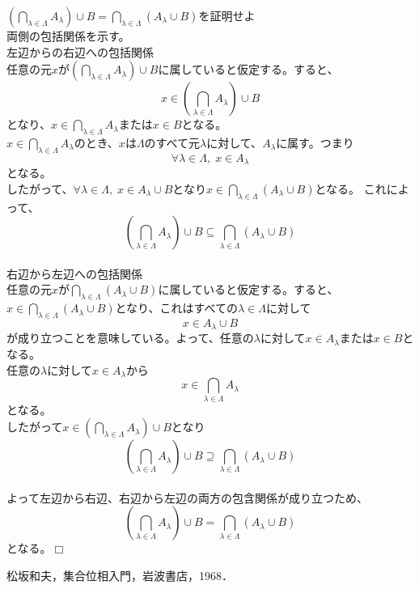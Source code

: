 \documentclass[a4j]{jsarticle}
\def \QED{\hfill $\Box$}%
\begin{document}
$\left( \bigcap_{\lambda \in \Lambda}A_\lambda \right) \cup B = \bigcap_{\lambda \in \Lambda}(A_\lambda \cup B)$を証明せよ\\

両側の包括関係を示す。\\

左辺からの右辺への包括関係\\
任意の元$x$が$\left( \bigcap_{\lambda \in \Lambda}A_\lambda \right) \cup B$に属していると仮定する。すると、$$x \in \left( \bigcap_{\lambda \in \Lambda}A_\lambda \right) \cup B$$となり、$x \in \bigcap_{\lambda \in \Lambda}A_\lambda$または$x \in B$となる。\\
$x \in \bigcap_{\lambda \in \Lambda}A_\lambda$のとき、$x$は$\Lambda$のすべて元$\lambda$に対して、$A_\lambda$に属す。つまり$$\forall \lambda \in \Lambda,\;x \in A_\lambda$$となる。\\
したがって、$\forall \lambda \in \Lambda,\;x \in A_\lambda \cup B$となり$x \in \bigcap_{\lambda \in \Lambda}(A_\lambda \cup B)$となる。
これによって、$$\left( \bigcap_{\lambda \in \Lambda}A_\lambda \right) \cup B \subseteq \bigcap_{\lambda \in \Lambda}(A_\lambda \cup B)$$\\

右辺から左辺への包括関係\\
任意の元$x$が$\bigcap_{\lambda \in \Lambda}(A_\lambda \cup B)$に属していると仮定する。すると、$x \in \bigcap_{\lambda \in \Lambda}(A_\lambda \cup B)$となり、これはすべての$\lambda \in \Lambda$に対して$$x \in A_\lambda \cup B$$が成り立つことを意味している。よって、任意の$\lambda$に対して$x \in A_\lambda$または$x \in B$となる。\\
任意の$\lambda$に対して$x \in A_\lambda$から$$x \in \bigcap_{\lambda \in \Lambda}A_\lambda$$となる。\\
したがって$x \in \left( \bigcap_{\lambda \in \Lambda}A_\lambda \right) \cup B$となり$$\left( \bigcap_{\lambda \in \Lambda}A_\lambda \right) \cup B \supseteq \bigcap_{\lambda \in \Lambda}(A_\lambda \cup B)$$\\
よって左辺から右辺、右辺から左辺の両方の包含関係が成り立つため、$$\left( \bigcap_{\lambda \in \Lambda}A_\lambda \right) \cup B = \bigcap_{\lambda \in \Lambda}(A_\lambda \cup B)$$となる。\QED


\begin{thebibliography}{99}
	松坂和夫，集合位相入門，岩波書店，1968．
\end{thebibliography}
\end{document}
